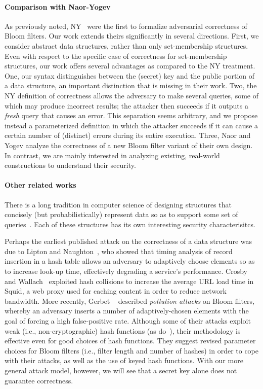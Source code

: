 \paragraph{Comparison with Naor-Yogev}
As previously noted, NY~\cite{naor2015bloom} were the first to
formalize adversarial correctness of Bloom filters.  Our work extends theirs
significantly in several directions. First, we consider abstract data
structures, rather than only set-membership structures.  Even with respect to
the specific case of correctness for set-membership structures, our work offers
several advantages as compared to the NY treatment.
%
One, our syntax distinguishes between the (secret) key and the public portion of
a data structure, an important distinction that is missing in their work.
%
Two, the NY definition of correctness allows the adversary to make
several queries, some of which may produce incorrect results; the attacker then
succeeds if it outputs a \emph{fresh} query that causes an error. This
separation seems arbitrary, and we propose instead a parameterized definition in
which the attacker succeeds if it can cause a certain number of (distinct)
errors during its entire execution.
%
Three, Naor and Yogev analyze the correctness of a new Bloom filter variant of
their own design. In contrast, we are mainly interested in analyzing existing,
real-world constructions to understand their security.

\paragraph{Other related works}
There is a long tradition in computer science of designing structures that
concisely (but probabilistically) represent data so as to support some set of
queries~\cite{chazelle2004bloomier,cormode2005improved,DP08a,DF03,fredman1984storing,mironov2011sketching}.
Each of these structures has its own interesting security characterisitcs.

Perhaps the earliest published attack on the correctness of a data structure was due to
Lipton and Naughton~\cite{lipton1993clocked}, who showed that timing analysis of
record insertion in a hash table allows an adversary to adaptively choose
elements so as to increase look-up time, effectively degrading a service's
performance.
%
Crosby and Wallach~\cite{crosby2003denial} exploited hash collisions to increase
the average URL load time in Squid, a web proxy used for caching content in
order to reduce network bandwidth.
%
More recently, Gerbet \etal~\cite{gerbet2015power} described \emph{pollution
attacks} on Bloom filters, whereby an adversary inserts a number of
adaptively-chosen elements with the goal of forcing a high false-positive rate.
Although some of their attacks exploit weak (i.e., non-cryptographic) hash
functions (as do~\cite{crosby2003denial}), their methodology is effective even
for good choices of hash functions.
%
They suggest revised parameter choices for Bloom filters (i.e., filter length and
number of hashes) in order to cope with their attacks, as well as the use of
keyed hash functions. With our more general attack model, however, we will see
that a secret key alone does not guarantee correctness.


